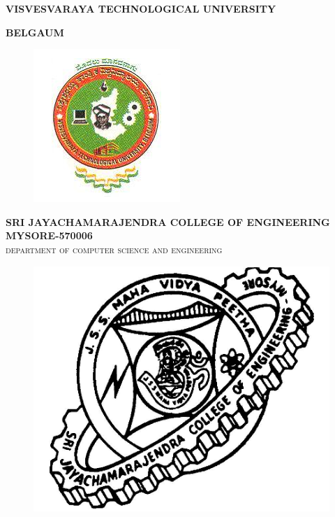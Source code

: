 \documentclass[12pt, oneside, a4paper]{article}
\begin{document}
\begin{center}
\textbf{VISVESVARAYA TECHNOLOGICAL UNIVERSITY}
\end{center}
\begin{center}
\textbf{BELGAUM}\\
\thispagestyle{empty}
\begin{figure}[htb]
\begin{center}
\ifpdf
	\includegraphics[scale=0.50]{vtu.png}
\else
\fi
\end{center}
\end{figure}
\textbf{SRI JAYACHAMARAJENDRA COLLEGE OF ENGINEERING}
\textbf{MYSORE-570006}\\
\textsc{department of computer science and engineering}
\end{center}
\begin{figure}[htb]
\begin{center}
\ifpdf
\includegraphics[scale=0.30]{./logo.png}
\else
\fi
\end{center}
\end{figure}
\end{document}
